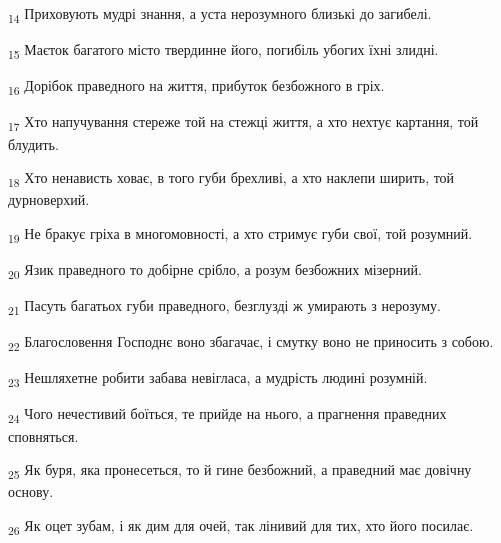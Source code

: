 \begin{tcolorbox}
\textsubscript{14} Приховують мудрі знання, а уста нерозумного близькі до загибелі.
\end{tcolorbox}
\begin{tcolorbox}
\textsubscript{15} Маєток багатого місто твердинне його, погибіль убогих їхні злидні.
\end{tcolorbox}
\begin{tcolorbox}
\textsubscript{16} Дорібок праведного на життя, прибуток безбожного в гріх.
\end{tcolorbox}
\begin{tcolorbox}
\textsubscript{17} Хто напучування стереже той на стежці життя, а хто нехтує картання, той блудить.
\end{tcolorbox}
\begin{tcolorbox}
\textsubscript{18} Хто ненависть ховає, в того губи брехливі, а хто наклепи ширить, той дурноверхий.
\end{tcolorbox}
\begin{tcolorbox}
\textsubscript{19} Не бракує гріха в многомовності, а хто стримує губи свої, той розумний.
\end{tcolorbox}
\begin{tcolorbox}
\textsubscript{20} Язик праведного то добірне срібло, а розум безбожних мізерний.
\end{tcolorbox}
\begin{tcolorbox}
\textsubscript{21} Пасуть багатьох губи праведного, безглузді ж умирають з нерозуму.
\end{tcolorbox}
\begin{tcolorbox}
\textsubscript{22} Благословення Господнє воно збагачає, і смутку воно не приносить з собою.
\end{tcolorbox}
\begin{tcolorbox}
\textsubscript{23} Нешляхетне робити забава невігласа, а мудрість людині розумній.
\end{tcolorbox}
\begin{tcolorbox}
\textsubscript{24} Чого нечестивий боїться, те прийде на нього, а прагнення праведних сповняться.
\end{tcolorbox}
\begin{tcolorbox}
\textsubscript{25} Як буря, яка пронесеться, то й гине безбожний, а праведний має довічну основу.
\end{tcolorbox}
\begin{tcolorbox}
\textsubscript{26} Як оцет зубам, і як дим для очей, так лінивий для тих, хто його посилає.
\end{tcolorbox}
